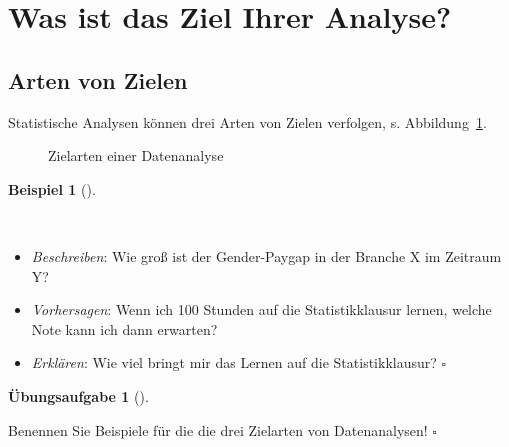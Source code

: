 \documentclass[
  letterpaper,
  twoside,
  open=any]{scrbook}
\providecommand{\tightlist}{%
  \setlength{\itemsep}{0pt}\setlength{\parskip}{0pt}}\usepackage{longtable,booktabs,array}
\theoremstyle{definition}
\newtheorem{exercise}{Übungsaufgabe}[chapter]
\theoremstyle{definition}
\newtheorem{example}{Beispiel}[chapter]
\theoremstyle{definition}
\theoremstyle{remark}
\begin{document}
\section{Was ist das Ziel Ihrer
Analyse?}\label{was-ist-das-ziel-ihrer-analyse}

\subsection{Arten von Zielen}\label{arten-von-zielen}

Statistische Analysen können drei Arten von Zielen verfolgen, s.
Abbildung~\ref{fig-ziele}.

\begin{figure}


\caption{\label{fig-ziele}Zielarten einer Datenanalyse}

\end{figure}%

\begin{example}[]\protect\hypertarget{exm-zielarten}{}\label{exm-zielarten}

~

\begin{itemize}
\tightlist
\item
  \emph{Beschreiben}: Wie groß ist der Gender-Paygap in der Branche X im
  Zeitraum Y?
\item
  \emph{Vorhersagen}: Wenn ich 100 Stunden auf die Statistikklausur
  lernen, welche Note kann ich dann erwarten?
\item
  \emph{Erklären}: Wie viel bringt mir das Lernen auf die
  Statistikklausur? \(\square\)
\end{itemize}

\end{example}

\begin{exercise}[]\protect\hypertarget{exr-ziele-stat}{}\label{exr-ziele-stat}

Benennen Sie Beispiele für die die drei Zielarten von Datenanalysen!
\(\square\)

\end{exercise}
\end{document}
